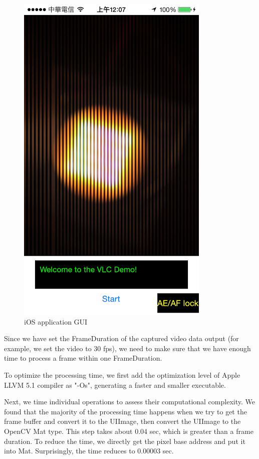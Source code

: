\begin{figure}[!htb]
  \centering
  \includegraphics[scale=0.25]{fig/ios_gui3.png}
  \caption{iOS application GUI}
  \label{fig:ios_gui}
\end{figure}

Since we have set the FrameDuration of the captured video data output (for example, we set the video to 30 fps), we need to make sure that we have enough time to process a frame within one FrameDuration.

To optimize the processing time, we first add the optimization level of Apple LLVM 5.1 compiler as "-Os", generating a faster and smaller executable.

Next, we time individual operations to assess their computational complexity. We found that the majority of the processing time happens when we try to get the frame buffer and convert it to the UIImage, then convert the UIImage to the OpenCV Mat type. This step takes about 0.04 sec, which is greater than a frame duration. To reduce the time, we directly get the pixel base address and put it into Mat. Surprisingly, the time reduces to 0.00003 sec.

